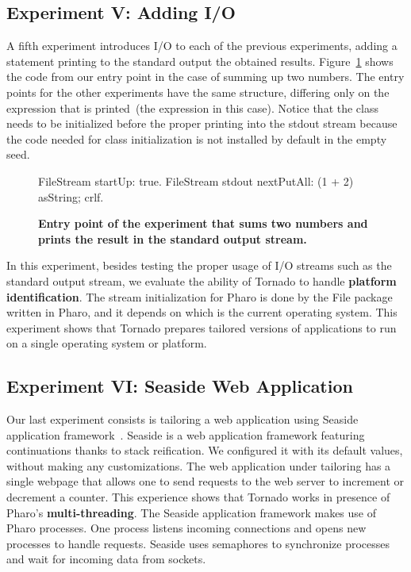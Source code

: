 \subsection*{Experiment V: Adding I/O} \label{sec:results_helloworld}

A fifth experiment introduces I/O to each of the previous experiments, adding a statement printing to the standard output the obtained results. Figure~\ref{fig:hello_world_entry_point} shows the code from our entry point in the case of summing up two numbers. The entry points for the other experiments have the same structure, differing only on the expression that is printed~(the  expression in this case). Notice that the  class needs to be initialized before the proper printing into the stdout stream because the code needed for class initialization is not installed by default in the empty seed.

\begin{figure}[ht]

\begin{code}
FileStream startUp: true.
FileStream stdout 
	nextPutAll: (1 + 2) asString;
	crlf.
\end{code}
\caption{ \textbf{Entry point of the experiment that sums two numbers and prints the result in the standard output stream.}\label{fig:hello_world_entry_point}}
\end{figure}

In this experiment, besides testing the proper usage of I/O streams such as the standard output stream, we evaluate the ability of Tornado to handle \textbf{platform identification}. The  stream initialization for Pharo is done by the File package written in Pharo, and it depends on which is the current operating system. This experiment shows that Tornado prepares tailored versions of applications to run on a single operating system or platform.

\subsection*{Experiment VI: Seaside Web Application}



Our last experiment consists is tailoring a web application using Seaside application framework~\cite{Duca07a}. Seaside is a web application framework featuring continuations thanks to stack reification. We configured it with its default values, without making any customizations. The web application under tailoring has a single webpage that allows one to send requests to the web server to increment or decrement a counter. This experience shows that Tornado works in presence of Pharo's \textbf{multi-threading}. The Seaside application framework makes use of Pharo processes. One process listens incoming connections and opens new processes to handle requests. Seaside uses semaphores to synchronize processes and wait for incoming data from sockets.

